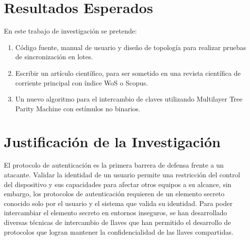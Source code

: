 \section{Resultados Esperados}
En este trabajo de investigación se pretende:
\begin{enumerate}
    \item Código fuente, manual de usuario y diseño de topología para realizar pruebas de sincronización en lotes.
    \item Escribir un artículo científico, para ser sometido en una revista científica de corriente principal con índice WoS o Scopus.
    \item Un nuevo algoritmo para el intercambio de claves utilizando Multilayer Tree Parity Machine con estímulos no binarios.
\end{enumerate}
\section{Justificación de la Investigación}
El protocolo de autenticación es la primera barrera de defensa frente a un atacante. Validar la identidad de un usuario permite una restricción del control del dispositivo y sus capacidades para afectar otros equipos a su alcance, sin embargo, los protocolos de autenticación requieren de un elemento secreto conocido solo por el usuario y el sistema que valida su identidad. Para poder intercambiar el elemento secreto en entornos inseguros, se han desarrollado diversas técnicas de intercambio de llaves que han permitido el desarrollo de protocolos que logran mantener la confidencialidad de las llaves compartidas.

